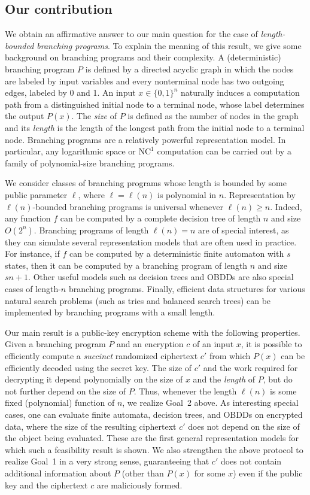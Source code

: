 \documentclass{article}
\newcommand{\nc}[1]{{\mathrm{NC}^{#1}}}
\newcommand{\NCone}{{\nc{1}}}
\begin{document}
\subsection{Our contribution}

We obtain an affirmative answer to our main question for the case of
{\em length-bounded branching programs}. To explain the meaning of
this result, we give some background on branching programs and their
complexity. A (deterministic) branching program $P$ is defined by a
directed acyclic graph in which the nodes are labeled by input
variables and every nonterminal node has two outgoing edges, labeled
by 0 and 1. An input $x\in\{0,1\}^n$ naturally induces a computation
path from a distinguished initial node to a terminal node, whose
label determines the output $P(x)$. The {\em size} of $P$ is defined
as the number of nodes in the graph and its {\em length} is the
length of the longest path from the initial node to a terminal node.
Branching programs are a relatively powerful representation model.
In particular, any logarithmic space or $\NCone$ computation can be
carried out by a family of polynomial-size branching programs.

We consider classes of branching programs whose length is bounded by
some public parameter $\ell$, where $\ell=\ell(n)$ is polynomial in
$n$. Representation by $\ell(n)$-bounded branching programs is
universal whenever $\ell(n)\ge n$. Indeed, any function $f$ can be
computed by a complete decision tree of length $n$ and size
$O(2^n)$. Branching programs of length $\ell(n)=n$ are of special
interest, as they can simulate several representation models that
are often used in practice.  For instance, if $f$ can be computed by
a deterministic finite automaton with $s$ states, then it can be
computed by a branching program of length $n$ and size $sn+1$. Other
useful models such as decision trees and OBDDs are also special
cases of length-$n$ branching programs. Finally, efficient data
structures for various natural search problems (such as tries and
balanced search trees) can be implemented by branching programs with
a small length.

Our main result is a public-key encryption scheme with the
following properties. Given a branching program $P$ and an
encryption $c$ of an input $x$, it is possible to efficiently
compute a {\em succinct} randomized ciphertext $c'$ from which
$P(x)$ can be efficiently decoded using the secret key. The size of
$c'$ and the work required for decrypting it depend polynomially on
the size of $x$ and the {\em length} of $P$, but do not further
depend on the size of $P$. Thus, whenever the length $\ell(n)$ is
some fixed (polynomial) function of $n$, we realize Goal~2 above.
As interesting special cases, one can evaluate finite automata,
decision trees, and OBDDs on encrypted data, where the size of the
resulting ciphertext $c'$ does not depend on the size of the object
being evaluated. These are the first general representation models
for which such a feasibility result is shown. We also strengthen
the above protocol to realize Goal~1 in a very strong sense,
guaranteeing that $c'$ does not contain additional information
about $P$ (other than $P(x)$ for some $x$) even if the public key
and the ciphertext $c$ are maliciously formed.
\end{document}
